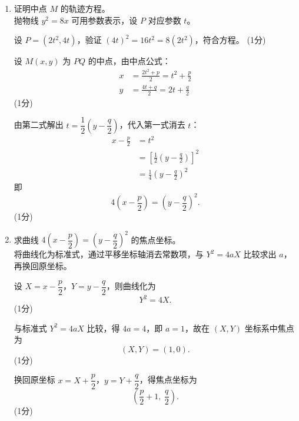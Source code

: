 \documentclass[12pt,a4paper]{exam-zh}
\begin{document}
\begin{solution}
    \begin{enumerate}[label=(\alph*)]
        \item 证明中点 $M$ 的轨迹方程。 \\
        抛物线 $y^2=8x$ 可用参数表示，设 $P$ 对应参数 $t$。

        设 $P=(2t^2,4t)$，验证 $(4t)^2=16t^2=8(2t^2)$，符合方程。
        \hfill (1分)

        设 $M(x,y)$ 为 $PQ$ 的中点，由中点公式：
        \begin{align*}
            x &=\frac{2t^2+p}{2}=t^2+\frac{p}{2} \\
            y &=\frac{4t+q}{2}=2t+\frac{q}{2}
        \end{align*}
        \hfill (1分)

        由第二式解出 $t=\dfrac{1}{2}\left(y-\dfrac{q}{2}\right)$，代入第一式消去 $t$：
        \begin{align*}
            x-\frac{p}{2} &=t^2 \\
            &=\left[\frac{1}{2}\left(y-\frac{q}{2}\right)\right]^2 \\
            &=\frac{1}{4}\left(y-\frac{q}{2}\right)^2
        \end{align*}
        即
        \[
            4\left(x-\frac{p}{2}\right)=\left(y-\frac{q}{2}\right)^2.
        \]
        \hfill (1分)

        \item 求曲线 $4\left(x-\dfrac{p}{2}\right)=\left(y-\dfrac{q}{2}\right)^2$ 的焦点坐标。 \\
        将曲线化为标准式，通过平移坐标轴消去常数项，与 $Y^2=4aX$ 比较求出 $a$，再换回原坐标。

        设 $X=x-\dfrac{p}{2}$，$Y=y-\dfrac{q}{2}$，则曲线化为
        \[
            Y^2=4X.
        \]
        \hfill (1分)

        与标准式 $Y^2=4aX$ 比较，得 $4a=4$，即 $a=1$，故在 $(X,Y)$ 坐标系中焦点为
        \[
            (X,Y)=(1,0).
        \]
        \hfill (1分)

        换回原坐标 $x=X+\dfrac{p}{2}$，$y=Y+\dfrac{q}{2}$，得焦点坐标为
        \[
            \left(\frac{p}{2}+1,\ \frac{q}{2}\right).
        \]
        \hfill (1分)
    \end{enumerate}
\end{solution}
\end{document}
